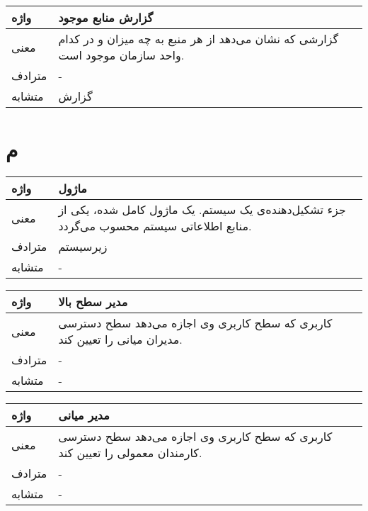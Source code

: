 \begin{table}[H]
	\centering
	\begin{tabular}{| p{1.5cm} | p{5cm} |}
		\hline
		واژه & گزارش منابع موجود \\
		\hline
		معنی  & گزارشی که نشان می‌دهد از هر منبع به چه میزان و در کدام واحد سازمان موجود است. \\
		\hline
		مترادف & - \\
		\hline
		متشابه  & گزارش \\
		\hline
	\end{tabular}
\end{table}

\section*{م}%
\begin{table}[H]
	\centering
	\begin{tabular}{| p{1.5cm} | p{5cm} |}
		\hline
		واژه & ماژول \\
		\hline
		معنی  & جزء تشکیل‌دهنده‌ی یک سیستم.  یک ماژول کامل شده، یکی از منابع اطلاعاتی سیستم محسوب می‌گردد. \\
		\hline
		مترادف & زیرسیستم \\
		\hline
		متشابه  & - \\
		\hline
	\end{tabular}
\end{table}

\begin{table}[H]
	\centering
	\begin{tabular}{| p{1.5cm} | p{5cm} |}
		\hline
		واژه & مدیر سطح بالا \\
		\hline
		معنی  & کاربری که سطح کاربری وی اجازه می‌دهد سطح دسترسی مدیران میانی را تعیین کند. \\
		\hline
		مترادف & - \\
		\hline
		متشابه  & - \\
		\hline
	\end{tabular}
\end{table}

\begin{table}[H]
	\centering
	\begin{tabular}{| p{1.5cm} | p{5cm} |}
		\hline
		واژه & مدیر میانی \\
		\hline
		معنی  & کاربری که سطح کاربری وی اجازه می‌دهد سطح دسترسی کارمندان معمولی را تعیین کند.  \\
		\hline
		مترادف & - \\
		\hline
		متشابه  & - \\
		\hline
	\end{tabular}
\end{table}

